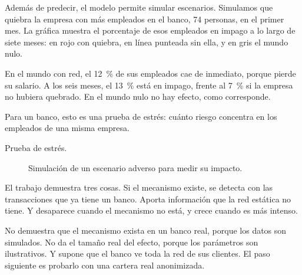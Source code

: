 \begin{decir}
Además de predecir, el modelo permite simular escenarios. Simulamos que quiebra la
empresa con más empleados en el banco, 74 personas, en el primer mes. La gráfica muestra
el porcentaje de esos empleados en impago a lo largo de siete meses: en rojo con
quiebra, en línea punteada sin ella, y en gris el mundo nulo.

En el mundo con red, el 12~\% de sus empleados cae de inmediato, porque pierde su salario.
A los seis meses, el 13~\% está en impago, frente al 7~\% si la empresa no hubiera
quebrado. En el mundo nulo no hay efecto, como corresponde.

Para un banco, esto es una prueba de estrés: cuánto riesgo concentra en los empleados de
una misma empresa.
\end{decir}
\begin{terminos}
\begin{description}
\item[Prueba de estrés.] Simulación de un escenario adverso para medir su impacto.
\end{description}
\end{terminos}

\begin{decir}
El trabajo demuestra tres cosas. Si el mecanismo existe, se detecta con las transacciones
que ya tiene un banco. Aporta información que la red estática no tiene. Y desaparece
cuando el mecanismo no está, y crece cuando es más intenso.

No demuestra que el mecanismo exista en un banco real, porque los datos son simulados.
No da el tamaño real del efecto, porque los parámetros son ilustrativos. Y supone que el
banco ve toda la red de sus clientes. El paso siguiente es probarlo con una cartera real
anonimizada.
\end{decir}
\begin{preguntas}
\end{preguntas}

